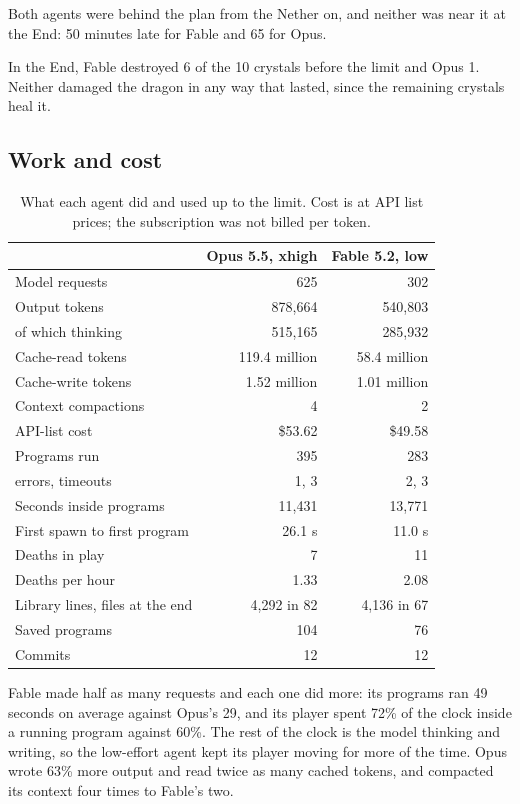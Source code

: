 \documentclass[11pt,a4paper]{article}
\begin{document}
Both agents were behind the plan from the Nether on, and neither was near it at the End: 50 minutes late for Fable and 65 for Opus.

In the End, Fable destroyed 6 of the 10 crystals before the limit and Opus 1. Neither damaged the dragon in any way that lasted, since the remaining crystals heal it.

\subsection{Work and cost}

\begin{table}[H]
\caption{What each agent did and used up to the limit. Cost is at API list prices; the subscription was not billed per token.}
\label{tab:work}
\begin{tabularx}{0.82\textwidth}{@{}Xrr@{}}
\toprule
 & Opus 5.5, xhigh & Fable 5.2, low \\
\midrule
Model requests & 625 & 302 \\
Output tokens & 878,664 & 540,803 \\
\quad of which thinking & 515,165 & 285,932 \\
Cache-read tokens & 119.4 million & 58.4 million \\
Cache-write tokens & 1.52 million & 1.01 million \\
Context compactions & 4 & 2 \\
API-list cost & \$53.62 & \$49.58 \\
\midrule
Programs run & 395 & 283 \\
\quad errors, timeouts & 1, 3 & 2, 3 \\
Seconds inside programs & 11,431 & 13,771 \\
First spawn to first program & 26.1 s & 11.0 s \\
\midrule
Deaths in play & 7 & 11 \\
Deaths per hour & 1.33 & 2.08 \\
\midrule
Library lines, files at the end & 4,292 in 82 & 4,136 in 67 \\
Saved programs & 104 & 76 \\
Commits & 12 & 12 \\
\bottomrule
\end{tabularx}
\end{table}

Fable made half as many requests and each one did more: its programs ran 49 seconds on average against Opus's 29, and its player spent 72\% of the clock inside a running program against 60\%. The rest of the clock is the model thinking and writing, so the low-effort agent kept its player moving for more of the time. Opus wrote 63\% more output and read twice as many cached tokens, and compacted its context four times to Fable's two.
\end{document}
